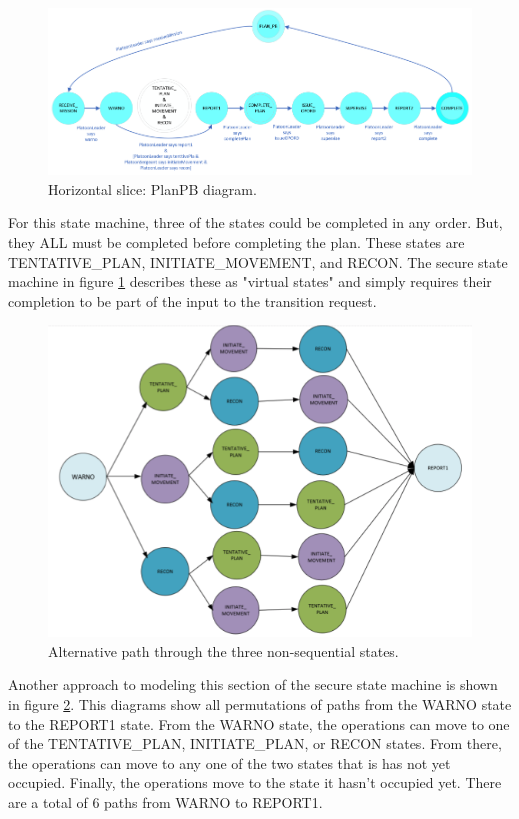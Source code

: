 \documentclass[../../main/main.tex]{subfiles}
\begin{document}
 \begin{figure}[h!]
\centering
\includegraphics[width=\textwidth]{../figures/ssmPlanPBDiagram}
\caption{\label{ssmPlanPBDiagram2} Horizontal slice: PlanPB diagram.}
\end{figure}

For this state machine, three of the states could be completed in any order.  But, they ALL must be completed before completing the plan.  These states are TENTATIVE_PLAN, INITIATE_MOVEMENT, and RECON.   The secure state machine in figure \ref{ssmPlanPBDiagram2} describes these as "virtual states"  and simply requires their completion to be part of the input to the transition request.  


 \begin{figure}[h!]
\centering
\includegraphics[width=\textwidth]{../figures/planAlt}
\caption{\label{planAlt} Alternative path through the three non-sequential states.}
\end{figure}

Another approach to modeling this section of the secure state machine is shown in figure \ref{planAlt}.  This diagrams show all permutations of paths from the WARNO state to the REPORT1 state. From the WARNO state, the operations can move to one of the TENTATIVE_PLAN, INITIATE_PLAN, or RECON states.  From there, the operations can move to any one of the two states that is has not yet occupied.  Finally, the operations move to the state it hasn't occupied yet.  There are a total of 6 paths from WARNO to REPORT1.
\end{document}
